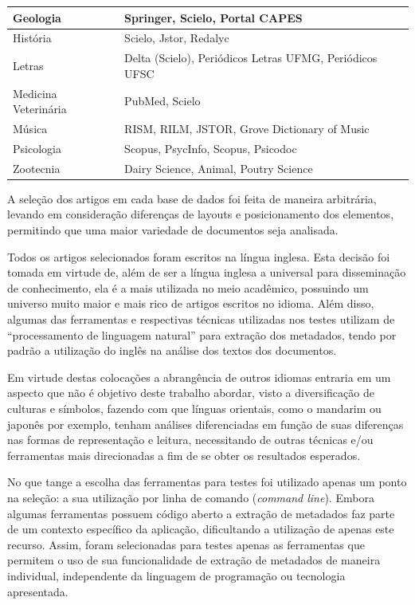 \begin{table}
\begin{center}
\begin{tabular}{|p{6cm}|p{8cm}|}
            Geologia & Springer, Scielo, Portal CAPES \\
            \hline
            História & Scielo, Jstor, Redalyc \\
            \hline
            Letras & Delta (Scielo), Periódicos Letras UFMG, Periódicos UFSC \\
            \hline
            Medicina Veterinária & PubMed, Scielo \\
            \hline
            Música & RISM, RILM, JSTOR, Grove Dictionary of Music \\
            \hline
            Psicologia & Scopus, PsycInfo, Scopus, Psicodoc \\
            \hline
            Zootecnia & Dairy Science, Animal, Poutry Science \\
            \hline
        \end{tabular}
    \end{center}
    \label{tab:databases}
\end{table}

A seleção dos artigos em cada base de dados foi feita de maneira arbitrária, levando em consideração diferenças de layouts e posicionamento dos elementos, permitindo que uma maior variedade de documentos seja analisada.


Todos os artigos selecionados foram escritos na língua inglesa. Esta decisão foi tomada em virtude de, além de ser a língua inglesa a universal para disseminação de conhecimento, ela é a mais utilizada no meio acadêmico, possuindo um universo muito maior e mais rico de artigos escritos no idioma. Além disso, algumas das ferramentas e respectivas técnicas utilizadas nos testes utilizam de ``processamento de linguagem natural'' para extração dos metadados, tendo por padrão a utilização do inglês na análise dos textos dos documentos.

Em virtude destas colocações a abrangência de outros idiomas entraria em um aspecto que não é objetivo deste trabalho abordar, visto a diversificação de culturas e símbolos, fazendo com que línguas orientais, como o mandarim ou japonês por exemplo, tenham análises diferenciadas em função de suas diferenças nas formas de representação e leitura, necessitando de outras técnicas e/ou ferramentas mais direcionadas a fim de se obter os resultados esperados.

No que tange a escolha das ferramentas para testes foi utilizado apenas um ponto na seleção: a sua utilização por linha de comando (\emph{command line}). Embora algumas ferramentas possuem código aberto a extração de metadados faz parte de um contexto específico da aplicação, dificultando a utilização de apenas este recurso. Assim, foram selecionadas para testes apenas as ferramentas que permitem o uso de sua funcionalidade de extração de metadados de maneira individual, independente da linguagem de programação ou tecnologia apresentada. 

